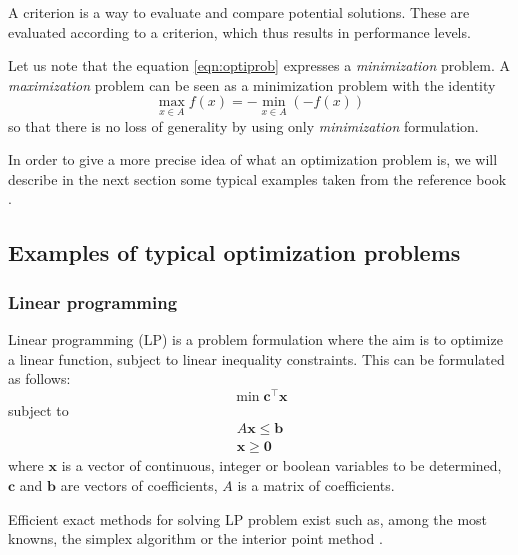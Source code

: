 \begin{definition}[Criterion]
A criterion is a way to evaluate and compare potential solutions. These are evaluated according to a criterion, which thus results in performance levels.
\end{definition}

Let us note that the equation \ref{eqn:optiprob} expresses a \emph{minimization} problem. A \emph{maximization} problem can be seen as a minimization problem with the identity
\begin{equation}
\max_{x \in A} f(x) = - \min_{x \in A} (-f(x))
\end{equation}
so that there is no loss of generality by using only \emph{minimization} formulation.

In order to give a more precise idea of what an optimization problem is, we will describe in the next section some typical examples taken from the reference book \cite{talbi09, BraMar2002}.

\subsection{Examples of typical optimization problems}
\subsubsection{Linear programming}
Linear programming (LP) is a problem formulation where the aim is to optimize a linear function, subject to linear inequality constraints. This can be formulated as follows:
\begin{equation}
\min \mathbf{c}^\intercal\mathbf{x}
\end{equation}
subject to
\begin{equation*}
\begin{gathered}
A\mathbf{x} \leq \mathbf{b}\\
\mathbf{x} \geq \mathbf{0}
\end{gathered}
\end{equation*}
where $\mathbf{x}$ is a vector of continuous, integer or boolean variables to be determined, $\mathbf{c}$ and $\mathbf{b}$ are vectors of coefficients, $A$ is a matrix of coefficients.

Efficient exact methods for solving LP problem exist such as, among the most knowns, the simplex algorithm \cite{dantzig51} or the interior point method \cite{Karmarkar84}.


